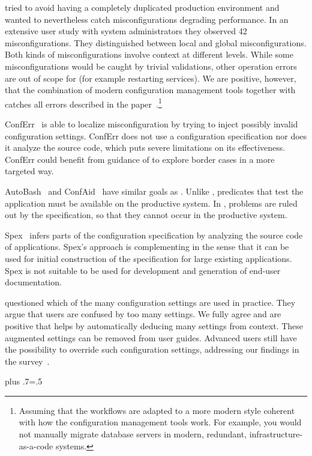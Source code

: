 \citet{nagaraja2004understanding} tried to avoid having a completely duplicated production environment and wanted to nevertheless catch misconfigurations degrading performance.
In an extensive user study with system administrators they observed 42 misconfigurations.
They distinguished between local and global misconfigurations.
Both kinds of misconfigurations involve context at different levels.
While some misconfigurations would be caught by trivial  validations, other operation errors are out of scope for \elektra{} (for example restarting services).
We are positive, however, that the combination of modern configuration management tools together with \elektra{} catches all errors described in the paper~\cite{nagaraja2004understanding}.\footnote{
Assuming that the workflows are adapted to a more modern style coherent with how the configuration management tools work.
For example, you would not manually migrate database servers in modern, redundant, infrastructure-as-a-code systems.}

ConfErr~\cite{keller2008conferr} is able to localize misconfiguration by trying to inject possibly invalid configuration settings.
ConfErr does not use a configuration specification nor does it analyze the source code, which puts severe limitations on its effectiveness.
ConfErr could benefit from guidance of  to explore border cases in a more targeted way.

AutoBash~\cite{su2007autobash} and ConfAid~\cite{attariyan2010automating} have similar goals as \elektra{}.
Unlike \elektra{}, predicates that test the application must be available on the productive system.
In \elektra{}, problems are ruled out by the specification, so that they cannot occur in the productive system.

Spex~\cite{xu2013blame} infers parts of the configuration specification by analyzing the source code of applications.
Spex's approach is complementing \elektra{} in the sense that it can be used for initial construction of the specification for large existing applications.
Spex is not suitable to be used for development and generation of end-user documentation.

\citet{xu2015hey} questioned which of the many configuration settings are used in practice.
They argue that users are confused by too many settings.
We fully agree and are positive that  helps by automatically deducing many settings from context.
These augmented settings can be removed from user guides.
Advanced users still have the possibility to override such configuration settings, addressing our findings in the survey~\cite{raab2017introducing}.%
{\parfillskip=0pt plus .7\textwidth \emergencystretch=.5\textwidth \par}

